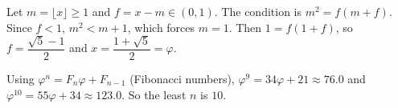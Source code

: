 Let $m=\lfloor x\rfloor\ge1$ and $f=x-m\in(0,1)$. The condition is $m^2=f(m+f)$. Since $f<1$, $m^2<m+1$, which forces $m=1$. Then $1=f(1+f)$, so $f=\dfrac{\sqrt5-1}2$ and $x=\dfrac{1+\sqrt5}2=\varphi$.

Using $\varphi^n=F_n\varphi+F_{n-1}$ (Fibonacci numbers), $\varphi^9=34\varphi+21\approx76.0$ and $\varphi^{10}=55\varphi+34\approx123.0$. So the least $n$ is $\boxed{10}$.
